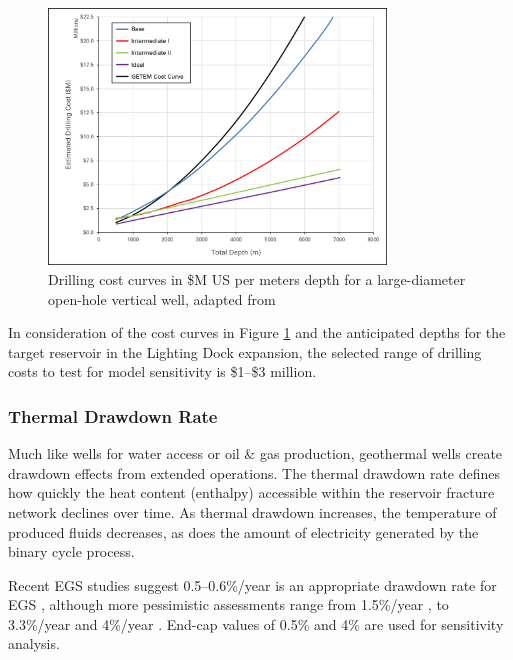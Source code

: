 \begin{figure}
\centering
\includegraphics[width=0.8\textwidth]{templates/images/Figure-Drilling_Cost_Curves.png}
\singlespacing
\caption[GeoVision drilling cost curves]{Drilling cost curves in \$M US per meters depth for a large-diameter open-hole vertical well, adapted from \citep[Figure 8]{augustine_geovision_2019}}
\label{fig:drill_cost_curves}
\end{figure}

In consideration of the cost curves in Figure \ref{fig:drill_cost_curves} and the anticipated depths for the target reservoir in the Lighting Dock expansion, the selected range of drilling costs to test for model sensitivity is \$1--\$3 million.

\subsubsection{Thermal Drawdown Rate}\label{ch4:drawdown_uncertainty}

Much like wells for water access or oil \& gas production, geothermal wells create drawdown effects from extended operations. The thermal drawdown rate defines how quickly the heat content (enthalpy) accessible within the reservoir fracture network declines over time. As thermal drawdown increases, the temperature of produced fluids decreases, as does the amount of electricity generated by the binary cycle process.

Recent EGS studies suggest 0.5--0.6\%/year is an appropriate drawdown rate for EGS \citep{augustine_geovision_2019}, although more pessimistic assessments range from 1.5\%/year \citep{beckers_low-temperature_2016}, to 3.3\%/year \citep{augustine_comparison_2006} and 4\%/year \citep{tester_economic_1990}. End-cap values of 0.5\% and 4\% are used for sensitivity analysis.

